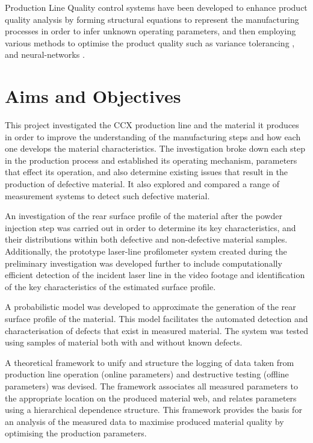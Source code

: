 \documentclass[12pt]{report}
\begin{document}
        Production Line Quality control systems have been developed to enhance product quality analysis by forming structural equations to represent the manufacturing processes in order to infer unknown operating parameters, and then employing various methods to optimise the product quality such as variance tolerancing \cite{suh2007dynamic},\cite{koo2001variance} and neural-networks \cite{ohshima2000quality}.
        
    \section{Aims and Objectives}
        This project investigated the CCX production line and the material it produces in order to improve the understanding of the manufacturing steps and how each one develops the material characteristics. The investigation broke down each step in the production process and established its operating mechanism, parameters that effect its operation, and also determine existing issues that result in the production of defective material. It also explored and compared a range of measurement systems to detect such defective material.
        
        An investigation of the rear surface profile of the material after the powder injection step was carried out in order to determine its key characteristics, and their distributions within both defective and non-defective material samples. Additionally, the prototype laser-line profilometer system created during the preliminary investigation was developed further to include computationally efficient detection of the incident laser line in the video footage and identification of the key characteristics of the estimated surface profile.
        
        A probabilistic model was developed to approximate the generation of the rear surface profile of the material. This model facilitates the automated detection and characterisation of defects that exist in measured material. The system was tested using samples of material both with and without known defects.
        
        A theoretical framework to unify and structure the logging of data taken from production line operation (online parameters) and destructive testing (offline parameters) was devised. The framework associates all measured parameters to the appropriate location on the produced material web, and relates parameters using a hierarchical dependence structure. This framework provides the basis for an analysis of the measured data to maximise produced material quality by optimising the production parameters.
    
\end{document}
